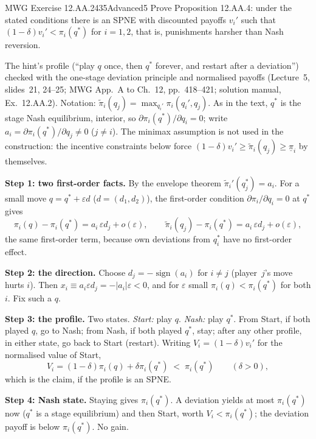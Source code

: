 \begin{exsol}{MWG Exercise 12.AA.2}{435}{Advanced}{5}
\asked Prove Proposition 12.AA.4: under the stated conditions there is an SPNE with discounted payoffs $v_i'$ such that
$(1-\delta)v_i' < \pi_i(q^*)$ for $i = 1,2$, that is, punishments harsher than Nash reversion.

\method The hint's profile (``play $q$ once, then $q^*$ forever, and restart after a deviation'') checked with the one-stage
deviation principle and normalised payoffs (Lecture~5, slides~21, 24--25; MWG App.~A to Ch.~12, pp.~418--421; solution manual,
Ex.~12.AA.2). Notation: $\tilde\pi_i(q_j) = \max_{q_i'}\pi_i(q_i',q_j)$. As in the text, $q^*$ is the stage Nash equilibrium, interior, so
$\partial\pi_i(q^*)/\partial q_i = 0$; write $a_i = \partial\pi_i(q^*)/\partial q_j \ne 0$ ($j \ne i$). The minimax assumption is not used in the
construction: the incentive constraints below force $(1-\delta)v_i' \ge \tilde\pi_i(q_j) \ge \underline\pi_i$ by themselves.

\solution
\textbf{Step 1: two first-order facts.} By the envelope theorem $\tilde\pi_i'(q_j^*) = a_i$. For a small move
$q = q^* + \varepsilon d$ ($d = (d_1,d_2)$), the first-order condition $\partial\pi_i/\partial q_i = 0$ at $q^*$ gives
\[
  \pi_i(q) - \pi_i(q^*) = a_i\,\varepsilon d_j + o(\varepsilon), \qquad
  \tilde\pi_i(q_j) - \pi_i(q^*) = a_i\,\varepsilon d_j + o(\varepsilon),
\]
the same first-order term, because own deviations from $q_i^*$ have no first-order effect.

\textbf{Step 2: the direction.} Choose $d_j = -\operatorname{sign}(a_i)$ for $i \ne j$ (player~$j$'s move hurts $i$). Then
$x_i \equiv a_i\varepsilon d_j = -|a_i|\varepsilon < 0$, and for $\varepsilon$ small
$\pi_i(q) < \pi_i(q^*)$ for both $i$. Fix such a $q$.

\textbf{Step 3: the profile.} Two states. \emph{Start:} play $q$. \emph{Nash:} play $q^*$. From Start, if both played
$q$, go to Nash; from Nash, if both played $q^*$, stay; after any other profile, in either state, go back to Start (restart).
Writing $V_i = (1-\delta)v_i'$ for the normalised value of Start,
\[
  V_i = (1-\delta)\pi_i(q) + \delta\pi_i(q^*) \;<\; \pi_i(q^*) \qquad (\delta > 0),
\]
which is the claim, if the profile is an SPNE.

\textbf{Step 4: Nash state.} Staying gives $\pi_i(q^*)$. A deviation yields at most $\pi_i(q^*)$ now ($q^*$ is a stage
equilibrium) and then Start, worth $V_i < \pi_i(q^*)$; the deviation payoff is below $\pi_i(q^*)$. No gain.


\end{exsol}
